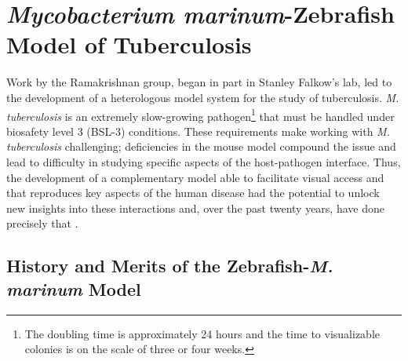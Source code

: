 \section{\textit{Mycobacterium marinum}-Zebrafish Model of Tuberculosis}\label{zfmm}

Work by the Ramakrishnan group, began in part in Stanley Falkow's lab, led to the development of a heterologous model system for the study of tuberculosis. \textit{M. tuberculosis} is an extremely slow-growing pathogen\footnote{The doubling time is approximately 24 hours and the time to visualizable colonies is on the scale of three or four weeks.} that must be handled under biosafety level 3 (BSL-3) conditions. These requirements make working with \textit{M. tuberculosis} challenging; deficiencies in the mouse model compound the issue and lead to difficulty in studying specific aspects of the host-pathogen interface. Thus, the development of a complementary model able to facilitate visual access and that reproduces key aspects of the human disease had the potential to unlock new insights into these interactions and, over the past twenty years, have done precisely that \citep{Myllymaki2016}.

\subsection{History and Merits of the Zebrafish-\textit{M. marinum} Model}\label{zfmmhis}


